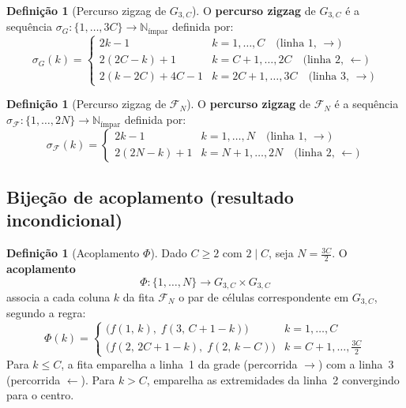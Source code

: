 \documentclass[12pt, a4paper]{article}
\theoremstyle{plain}
\theoremstyle{definition}
\newtheorem{definition}[theorem]{Definição}
\theoremstyle{remark}
\begin{document}
	\begin{definition}[Percurso zigzag de $G_{3,C}$]
		\label{def:zigzag-grade}
		O \textbf{percurso zigzag} de $G_{3,C}$ é a sequência
		$\sigma_G:\{1,\ldots,3C\}\to\mathbb{N}_{\text{ímpar}}$ definida
		por:
		\[
		\sigma_G(k) = \begin{cases}
			2k-1
			& k=1,\ldots,C
			\quad\text{(linha~1, }\rightarrow\text{)}\\[4pt]
			2(2C-k)+1
			& k=C+1,\ldots,2C
			\quad\text{(linha~2, }\leftarrow\text{)}\\[4pt]
			2(k-2C)+4C-1
			& k=2C+1,\ldots,3C
			\quad\text{(linha~3, }\rightarrow\text{)}
		\end{cases}
		\]
	\end{definition}
	
	\begin{definition}[Percurso zigzag de $\mathcal{F}_N$]
		\label{def:zigzag-fita}
		O \textbf{percurso zigzag} de $\mathcal{F}_N$ é a sequência
		$\sigma_{\mathcal{F}}:\{1,\ldots,2N\}\to\mathbb{N}_{\text{ímpar}}$
		definida por:
		\[
		\sigma_{\mathcal{F}}(k) = \begin{cases}
			2k-1
			& k=1,\ldots,N
			\quad\text{(linha~1, }\rightarrow\text{)}\\[4pt]
			2(2N-k)+1
			& k=N+1,\ldots,2N
			\quad\text{(linha~2, }\leftarrow\text{)}
		\end{cases}
		\]
	\end{definition}
	
	\subsection{Bijeção de acoplamento (resultado incondicional)}
	
	\begin{definition}[Acoplamento $\Phi$]
		\label{def:phi}
		Dado $C\geq2$ com $2\mid C$, seja $N=\frac{3C}{2}$.
		O \textbf{acoplamento}
		\[
		\Phi: \{1,\ldots,N\} \longrightarrow G_{3,C}\times G_{3,C}
		\]
		associa a cada coluna $k$ da fita $\mathcal{F}_N$ o par de células
		correspondente em $G_{3,C}$, segundo a regra:
		\[
		\Phi(k) = \begin{cases}
			\bigl(f(1,\,k),\; f(3,\,C+1-k)\bigr)
			& k = 1,\ldots,C\\[6pt]
			\bigl(f(2,\,2C+1-k),\; f(2,\,k-C)\bigr)
			& k = C+1,\ldots,\tfrac{3C}{2}
		\end{cases}
		\]
		Para $k\leq C$, a fita emparelha a linha~1 da grade
		(percorrida $\rightarrow$) com a linha~3 (percorrida
		$\leftarrow$).  Para $k>C$, emparelha as extremidades da linha~2
		convergindo para o centro.
	\end{definition}
	
\end{document}
